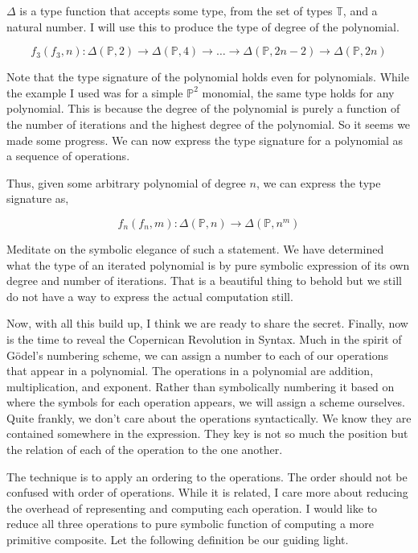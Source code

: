 $\Delta$ is a type function that accepts some type, from the set of types
$\mathbb{T}$, and a natural number. I will use this to produce the type of
degree of the polynomial.

\begin{equation}
    f_3(f_3,n): \Delta(\mathbb{P}, 2) \rightarrow \Delta(\mathbb{P}, 4) \rightarrow \dots \rightarrow  \Delta(\mathbb{P}, 2n-2) \rightarrow \Delta(\mathbb{P}, 2n)
\end{equation}

Note that the type signature of the polynomial holds even for polynomials.
While the example I used was for a simple $\mathbb{P}^2$ monomial, the same
type holds for any polynomial. This is because the degree of the polynomial is
purely a function of the number of iterations and the highest degree of the
polynomial. So it seems we made some progress. We can now express the type
signature for a polynomial as a sequence of operations.

Thus, given some arbitrary polynomial of degree $n$, we can express the type
signature as,

\begin{equation}
    f_n(f_n,m): \Delta(\mathbb{P}, n) \rightarrow \Delta(\mathbb{P}, n^m)
\end{equation}

Meditate on the symbolic elegance of such a statement. We have determined what
the type of an iterated polynomial is by pure symbolic expression of its own
degree and number of iterations. That is a beautiful thing to behold but we
still do not have a way to express the actual computation still.

Now, with all this build up, I think we are ready to share the secret. Finally,
now is the time to reveal the Copernican Revolution in Syntax. Much in the
spirit of G\"odel's numbering scheme, we can assign a number to each of our
operations that appear in a polynomial. The operations in a polynomial are
addition, multiplication, and exponent. Rather than symbolically numbering it
based on where the symbols for each operation appears, we will assign a scheme
ourselves. Quite frankly, we don't care about the operations syntactically. We
know they are contained somewhere in the expression. They key is not so much
the position but the relation of each of the operation to the one another.

The technique is to apply an ordering to the operations. The order should not
be confused with order of operations. While it is related, I care more about
reducing the overhead of representing and computing each operation. I would
like to reduce all three operations to pure symbolic function of computing a
more primitive composite. Let the following definition be our guiding light.


